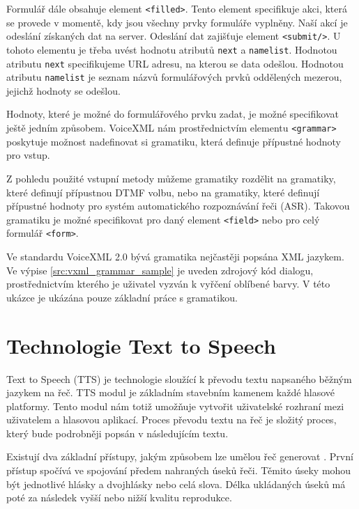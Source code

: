 \documentclass[ing,male,java,dept460]{diploma}						%
\begin{document}
Formulář dále obsahuje element \texttt{<filled>}. Tento element specifikuje akci, která se provede v momentě, kdy jsou všechny prvky formuláře vyplněny. Naší akcí je odeslání získaných dat na server. Odeslání dat zajišťuje element \texttt{<submit/>}. U tohoto elementu je třeba uvést hodnotu atributů \texttt{next} a \texttt{namelist}. Hodnotou atributu \texttt{next} specifikujeme URL adresu, na kterou se data odešlou. Hodnotou atributu \texttt{namelist} je seznam názvů formulářových prvků oddělených mezerou, jejichž hodnoty se odešlou.



Hodnoty, které je možné do formulářového prvku zadat, je možné specifikovat ještě jedním způsobem. VoiceXML nám prostřednictvím elementu \texttt{<grammar>} poskytuje možnost nadefinovat si gramatiku, která definuje přípustné hodnoty pro vstup.

Z pohledu použité vstupní metody můžeme gramatiky rozdělit na gramatiky, které definují přípustnou DTMF volbu, nebo na gramatiky, které definují přípustné hodnoty pro systém automatického rozpoznávání řeči (ASR). Takovou gramatiku je možné specifikovat pro daný element \texttt{<field>} nebo pro celý formulář \texttt{<form>}.

Ve standardu VoiceXML 2.0 bývá gramatika nejčastěji popsána XML jazykem. Ve výpise \ref{src:vxml_grammar_sample} je uveden zdrojový kód dialogu, prostřednictvím kterého je uživatel vyzván k vyřčení oblíbené barvy. V této ukázce je ukázána pouze základní práce s gramatikou.



\section{Technologie Text to Speech}
\label{sec:TTS}
Text to Speech (TTS) je technologie sloužící k převodu textu napsaného běžným jazykem na řeč. TTS modul je základním stavebním kamenem každé hlasové platformy. Tento modul nám totiž umožňuje vytvořit uživatelské rozhraní mezi uživatelem a hlasovou aplikací. Proces převodu textu na řeč je složitý proces, který bude podrobněji popsán v následujícím textu.

Existují dva základní přístupy, jakým způsobem lze umělou řeč generovat \cite{tts_wiki}. První přístup spočívá ve spojování předem nahraných úseků řeči. Těmito úseky mohou být jednotlivé hlásky a dvojhlásky nebo celá slova. Délka ukládaných úseků má poté za následek vyšší nebo nižší kvalitu reprodukce.
\end{document}
